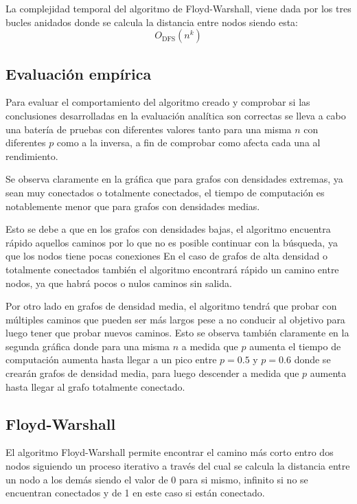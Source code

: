La complejidad temporal del algoritmo de Floyd-Warshall, viene dada por los tres bucles anidados donde se calcula la distancia entre nodos  siendo esta:
\begin{equation}
    O_{\mathrm{DFS}}(n^k) 
\end{equation}

\subsection*{Evaluación empírica}

Para evaluar el comportamiento del algoritmo creado y comprobar si las conclusiones desarrolladas en la evaluación analítica son correctas se lleva a cabo una batería de pruebas con diferentes valores tanto para una misma $n$ con diferentes $p$ como a la inversa, a fin de comprobar como afecta cada una al rendimiento.


Se observa claramente en la gráfica que para grafos con densidades extremas, ya sean muy conectados o totalmente conectados, el tiempo de computación es notablemente menor que para grafos con densidades medias.

Esto se debe a que en los grafos con densidades bajas, el algoritmo encuentra rápido aquellos caminos por lo que no es posible continuar con la búsqueda, ya que los nodos tiene pocas conexiones  En el caso de grafos de alta densidad o totalmente conectados también el algoritmo encontrará rápido un camino entre nodos, ya que habrá pocos o nulos caminos sin salida.

Por otro lado en grafos de densidad media, el algoritmo tendrá que probar con múltiples caminos que pueden ser más largos pese a no conducir al objetivo para luego tener que probar nuevos caminos.
Esto se observa también claramente en la segunda gráfica donde para una misma $n$ a medida que $p$ aumenta el tiempo de computación aumenta hasta llegar a un pico entre $p=0.5$ y $p=0.6$ donde se crearán grafos de densidad media, para luego descender a medida que $p$ aumenta hasta llegar al grafo totalmente conectado.



\subsection{Floyd-Warshall}\label{subsec:fw}

El algoritmo Floyd-Warshall permite encontrar el camino más corto entro dos nodos siguiendo un proceso iterativo a través del cual se calcula la distancia entre un nodo a los demás siendo el valor de 0 para si mismo, infinito si no se encuentran conectados y de 1 en este caso si están conectado. 

